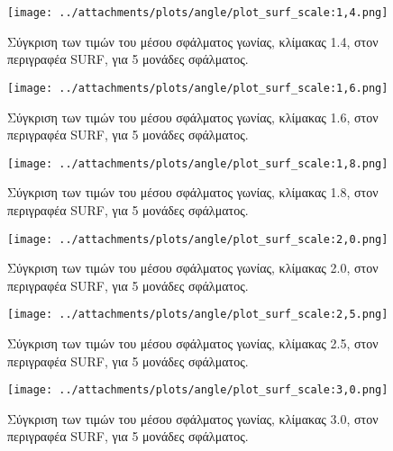  \begin{figure}[ht!]
\begin{minipage}[b]{1.0\linewidth}
\centering
\texttt{[image: ../attachments/plots/angle/plot\_surf\_scale:1,4.png]}
\caption{Σύγκριση των τιμών του μέσου σφάλματος γωνίας, κλίμακας 1.4, στον περιγραφέα SURF, για 5 μονάδες σφάλματος.}
\label{figure:plot_scale_surf_high_1.4}
\end{minipage}
\end{figure} 
\begin{figure}[ht!]
\begin{minipage}[b]{1.0\linewidth}
\centering
\texttt{[image: ../attachments/plots/angle/plot\_surf\_scale:1,6.png]}
\caption{Σύγκριση των τιμών του μέσου σφάλματος γωνίας, κλίμακας 1.6, στον περιγραφέα SURF, για 5 μονάδες σφάλματος.}
\label{figure:plot_scale_surf_high_1.6}
\end{minipage}

 \end{figure} 
 
 \newpage
 
 \begin{figure}[ht!]
\begin{minipage}[b]{1.0\linewidth}
\centering
\texttt{[image: ../attachments/plots/angle/plot\_surf\_scale:1,8.png]}
\caption{Σύγκριση των τιμών του μέσου σφάλματος γωνίας, κλίμακας 1.8, στον περιγραφέα SURF, για 5 μονάδες σφάλματος.}
\label{figure:plot_scale_surf_high_1.8}
\end{minipage}
\end{figure} 
\begin{figure}[ht!]
\begin{minipage}[b]{1.0\linewidth}
\centering
\texttt{[image: ../attachments/plots/angle/plot\_surf\_scale:2,0.png]}
\caption{Σύγκριση των τιμών του μέσου σφάλματος γωνίας, κλίμακας 2.0, στον περιγραφέα SURF, για 5 μονάδες σφάλματος.}
\label{figure:plot_scale_surf_high_2.0}
\end{minipage}

 \end{figure} 
 
 \newpage
 
 \begin{figure}[ht!]
\begin{minipage}[b]{1.0\linewidth}
\centering
\texttt{[image: ../attachments/plots/angle/plot\_surf\_scale:2,5.png]}
\caption{Σύγκριση των τιμών του μέσου σφάλματος γωνίας, κλίμακας 2.5, στον περιγραφέα SURF, για 5 μονάδες σφάλματος.}
\label{figure:plot_scale_surf_high_2.5}
\end{minipage}
\end{figure} 
\begin{figure}[ht!]
\begin{minipage}[b]{1.0\linewidth}
\centering
\texttt{[image: ../attachments/plots/angle/plot\_surf\_scale:3,0.png]}
\caption{Σύγκριση των τιμών του μέσου σφάλματος γωνίας, κλίμακας 3.0, στον περιγραφέα SURF, για 5 μονάδες σφάλματος.}
\label{figure:plot_scale_surf_high_3.0}
\end{minipage}

 \end{figure} 
 
